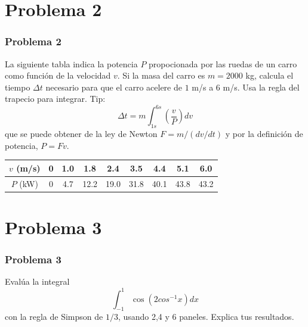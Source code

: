 \documentclass[12pt]{beamer}
\begin{document}
\section{Problema 2}
\begin{frame}
\frametitle{Problema 2}
La siguiente tabla indica la potencia $P$ propocionada por las ruedas de un carro como funci\'{o}n de la velocidad $v$. Si la masa del carro es $m=2000$ kg, calcula el tiempo $\Delta t$ necesario para que el carro acelere de $1$ m/s a $6$ m/s. Usa la regla del trapecio para integrar. Tip:
\[ \Delta t = m \int_{1s}^{6s} \left( \dfrac{v}{P} \right) dv\]
que se puede obtener de la ley de Newton $F= m/(dv/dt)$ y por la definici\'{o}n de potencia, $P=Fv$.
\begin{center}
\begin{tabular}{c | c | c | c | c | c | c | c | c}
$v$ (m/s) & 0 & 1.0 & 1.8 & 2.4 & 3.5 & 4.4 & 5.1 & 6.0 \\ \hline
$P$ (kW)  & 0 & 4.7 & 12.2 & 19.0 & 31.8 & 40.1 & 43.8 & 43.2 
\end{tabular}
\end{center}
\end{frame}
\begin{frame}

\end{frame}
\section{Problema 3}
\begin{frame}
\frametitle{Problema 3}
Evalúa la integral
\[ \int_{-1}^{1} \cos \left( 2 cos^{-1} x \right) dx\]
con la regla de Simpson de $1/3$, usando 2,4 y 6 paneles. Explica tus resultados.
\end{frame}
\end{document}

